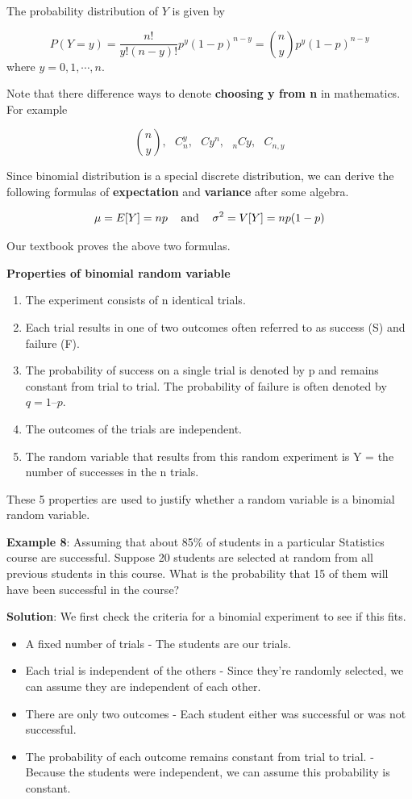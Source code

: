 \documentclass[
]{book}
\providecommand{\tightlist}{%
  \setlength{\itemsep}{0pt}\setlength{\parskip}{0pt}}
\begin{document}
The probability distribution of \(Y\) is given by

\[
P(Y = y) = \frac{n!}{y!(n-y)!}p^y(1-p)^{n-y} = {n\choose y}p^y(1-p)^{n-y}
\]
where \(y = 0, 1, \cdots, n\).

Note that there difference ways to denote \textbf{choosing y from n} in mathematics. For example

\[
{n\choose y}, \mbox{   } C_n^y, \mbox{   }  Cy^n,  \mbox{   }  _nCy,  \mbox{   }  C_{n,y}
\]

Since binomial distribution is a special discrete distribution, we can derive the following formulas of \textbf{expectation} and \textbf{variance} after some algebra.

\[\mu = E[Y] = np \hspace{3mm}\mbox{ and } \hspace{3mm}\sigma^2 = V[Y] = np(1-p)\]

Our textbook proves the above two formulas.

\textbf{Properties of binomial random variable}

\begin{enumerate}
\def\labelenumi{\arabic{enumi}.}
\item
  The experiment consists of n identical trials.
\item
  Each trial results in one of two outcomes often referred to as success (S) and failure (F).
\item
  The probability of success on a single trial is denoted by p and remains constant from trial to trial. The probability of failure is often denoted by \(q = 1 – p\).
\item
  The outcomes of the trials are independent.
\item
  The random variable that results from this random experiment is Y = the number of successes in the n trials.
\end{enumerate}

These 5 properties are used to justify whether a random variable is a binomial random variable.

\textbf{Example 8}: Assuming that about 85\% of students in a particular Statistics course are successful. Suppose 20 students are selected at random from all previous students in this course. What is the probability that 15 of them will have been successful in the course?

\textbf{Solution}: We first check the criteria for a binomial experiment to see if this fits.

\begin{itemize}
\tightlist
\item
  A fixed number of trials - The students are our trials.
\item
  Each trial is independent of the others - Since they're randomly selected, we can assume they are independent of each other.
\item
  There are only two outcomes - Each student either was successful or was not successful.
\item
  The probability of each outcome remains constant from trial to trial. - Because the students were independent, we can assume this probability is constant.
\end{itemize}
\end{document}
